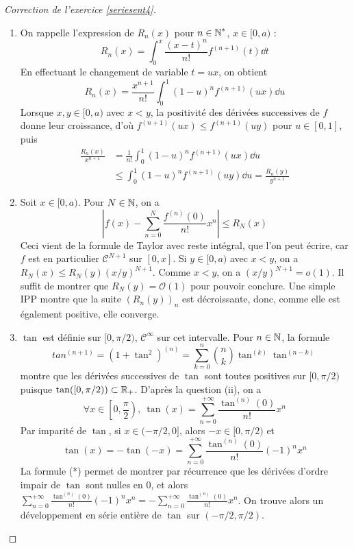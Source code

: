 \begin{proof}[Correction de l'exercice \ref{seriesent4}]\hfill
	\begin{enumerate}
        \item On rappelle l'expression de $R_n(x)$ pour $n\in\operatorname{\mathbb N}^*$, $x\in[0,a)$ :
        \[
            R_n(x)=\int_0^x\frac{(x-t)^n}{n!}f^{(n+1)}(t)\dd t
        \]
        En effectuant le changement de variable $t=ux$, on obtient 
        \[
            R_n(x)=\frac{x^{n+1}}{n!}\int_0^1(1-u)^nf^{(n+1)}(ux)\dd u
        \]
        Lorsque $x,y\in[0,a)$ avec $x<y$, la positivité des dérivées successives de $f$ donne leur croissance,
        d'où $f^{(n+1)}(ux)\leq f^{(n+1)}(uy)$ pour $u\in[0,1]$, puis
        \begin{align*}
            \frac{R_n(x)}{x^{n+1}}&=\frac1{n!}\int_0^1(1-u)^nf^{(n+1)}(ux)\dd u\\
                                  &\leq \int_0^1(1-u)^nf^{(n+1)}(uy)\dd u=\frac{R_n(y)}{y^{n+1}}
        \end{align*}
        \item Soit $x\in[0,a)$. Pour $N\in\operatorname{\mathbb N}$, on a 
        \[
            \left|f(x)-\sum_{n=0}^N\frac{f^{(n)}(0)}{n!}x^n\right|\leq R_N(x)
        \]
        Ceci vient de la formule de Taylor avec reste intégral, que l'on peut écrire, car $f$ est en particulier $\mathcal C^{N+1}$ sur $[0,x]$.
        Si $y\in[0,a)$ avec $x<y$, on a $R_N(x)\leq R_N(y)(x/y)^{N+1}$.
        Comme $x<y$, on a $(x/y)^{N+1}=o(1)$. Il suffit de montrer que $R_N(y)=\mathcal O(1)$ pour pouvoir conclure.
        Une simple IPP montre que la suite $(R_n(y))_n$ est décroissante, donc, comme elle est également positive, elle converge.

        \item $\tan$ est définie sur $[0,\pi/2)$, $\mathcal C^\infty$ sur cet intervalle. 
        Pour $n\in\operatorname{\mathbb N}$, la formule
        \[
            tan^{(n+1)}=(1+\tan^2)^{(n)}=\sum_{k=0}^n\binom nk\tan^{(k)}\tan^{(n-k)}    \tag*{(*)}
        \]
        montre que les dérivées successives de $\tan$ sont toutes positives sur $[0,\pi/2)$ puisque $\tan([0,\pi/2))\subset\operatorname{\mathbb R}_+$.
        D'après la question (ii), on a 
        \[
            \forall x\in\left[0,\frac\pi2\right),\ \tan(x)=\sum_{n=0}^{+\infty}\frac{\tan^{(n)}(0)}{n!}x^n
        \]
        Par imparité de $\tan$, si $x\in(-\pi/2,0]$, alors $-x\in[0,\pi/2)$ et 
        \[
            \tan(x)=-\tan(-x)=\sum_{n=0}^{+\infty}\frac{\tan^{(n)}(0)}{n!}(-1)^nx^n   
        \]
        La formule (*) permet de montrer par récurrence que les dérivées d'ordre impair de $\tan$ sont nulles en 0, 
		et alors $\sum_{n=0}^{+\infty}\frac{\tan^{(n)}(0)}{n!}(-1)^nx^n=-\sum_{n=0}^{+\infty}\frac{\tan^{(n)}(0)}{n!}x^n$.
        On trouve alors un développement en série entière de $\tan$ sur $(-\pi/2,\pi/2)$.
    \end{enumerate}
\end{proof}
